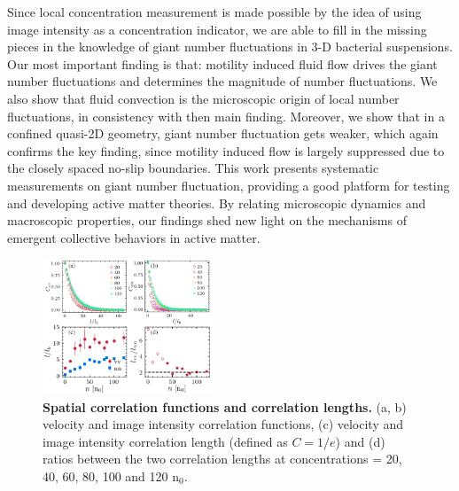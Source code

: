 \documentclass[twocolumn,aps,prl,amsmath,amssymb,longbibliography]{revtex4-1}
\begin{document}
Since local concentration measurement is made possible by the idea of using image intensity as a concentration indicator, we are able to fill in the missing pieces in the knowledge of giant number fluctuations in 3-D bacterial suspensions. Our most important finding is that: motility induced fluid flow drives the giant number fluctuations and determines the magnitude of number fluctuations. We also show that fluid convection is the microscopic origin of local number fluctuations, in consistency with then main finding. Moreover, we show that in a confined quasi-2D geometry, giant number fluctuation gets weaker, which again confirms the key finding, since motility induced flow is largely suppressed due to the closely spaced no-slip boundaries. This work presents systematic measurements on giant number fluctuation, providing a good platform for testing and developing active matter theories. By relating microscopic dynamics and macroscopic properties, our findings shed new light on the mechanisms of emergent collective behaviors in active matter.


\begin{figure}[!]
\begin{center}
\includegraphics[width=0.45\textwidth]{figures/fig-2-v2.PNG}
\caption[]{\textbf{Spatial correlation functions and correlation lengths.} (a, b) velocity and image intensity correlation functions, (c) velocity and image intensity correlation length (defined as $C=1/e$) and (d) ratios between the two correlation lengths at concentrations = 20, 40, 60, 80, 100 and 120 n$_0$.}
\label{fig:2}
\end{center}
\end{figure}
\end{document}
